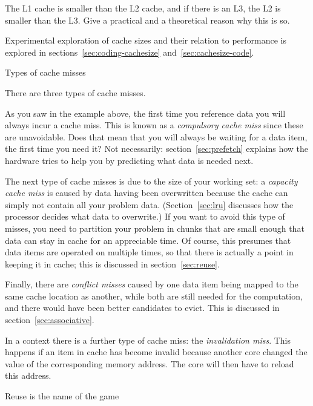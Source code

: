 \begin{exercise}
  The L1 cache is smaller than the L2 cache, and if there is an L3,
  the L2 is smaller than the L3. Give a practical and a theoretical
  reason why this is so.  
\end{exercise}

Experimental exploration of cache sizes and their relation to
performance is explored in sections~\ref{sec:coding-cachesize}
and~\ref{sec:cachesize-code}.

 {Types of cache misses}
\label{sec:cache-miss}

There are three types of cache misses.

As you saw in the example above, the first time you reference data you
will always incur a cache miss. This is known as a \emph{compulsory
cache miss} since these are unavoidable.
Does that mean that you will always be waiting for a data item, the first
time you need it? Not necessarily: section~\ref{sec:prefetch} explains
how the hardware tries to help you by predicting what data is needed next.

The next type of cache misses is due to the size of your working set:
a \emph{capacity cache miss} is caused by
data having been overwritten because the cache can simply not contain
all your problem data. (Section~\ref{sec:lru} discusses how the processor
decides what data to overwrite.) If you want to avoid this type of misses, you
need to partition your problem in chunks that are small enough that
data can stay in cache for an appreciable time. Of course, this
presumes that data items are operated on multiple times, so that there
is actually a point in keeping it in cache; this is discussed in
section~\ref{sec:reuse}.

Finally, there are \emph{conflict misses}
caused by one data item being mapped to the same cache location
as another, while both are still needed for the computation, and
there would have been better candidates to evict. This is discussed
in section~\ref{sec:associative}.

In a  context there is a further type of cache miss:
the \emph{invalidation miss}. This happens
if an item in cache has become invalid because another core
changed the value of the corresponding memory address. The core will then
have to reload this address.

 {Reuse is the name of the game}


